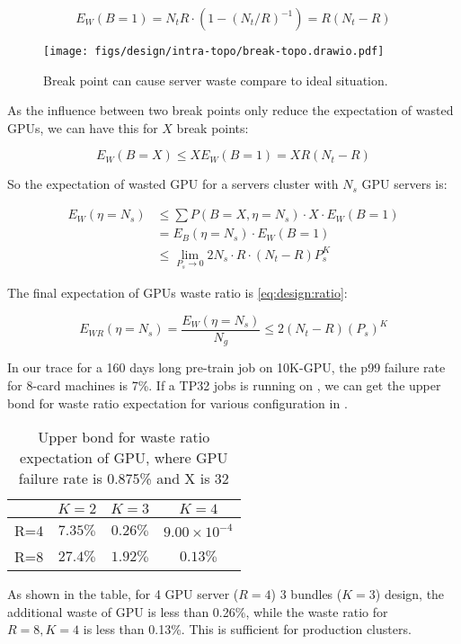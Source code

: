 \vspace{-1em}
$$
E_W(B=1) = N_t R\cdot (1 - (N_t/R)^{-1} ) = R(N_t -R)
$$

\begin{figure}[h!t]
    \centering
    \texttt{[image: figs/design/intra-topo/break-topo.drawio.pdf]}
    \caption{Break point can cause server waste compare to ideal situation.}
    \vspace{-1em}
    \label{fig:subline-waste}
\end{figure}

As the influence between two break points only reduce the expectation of wasted GPUs, we can have this for $X$ break points:

\vspace{-1em}
\begin{equation*}
E_W(B = X) \leq XE_W(B=1) = XR(N_t-R)
\end{equation*}

So the expectation of wasted GPU for a servers cluster with $N_s$ GPU servers is:

\vspace{-1em}
\begin{align*}
E_W(\eta = N_s) &\leq \sum P(B=X ,\eta = N_s) \cdot X\cdot  E_W(B=1)\\
&= E_B(\eta = N_s)\cdot E_W(B=1)\\
&\leq  \lim_{P_s\rightarrow 0}2N_s\cdot R \cdot (N_t-R)P_s^K
\end{align*}



The final expectation of GPUs waste ratio is \eqref{eq:design:ratio}:

\begin{equation}
E_{WR}(\eta = N_s) = \frac{E_W(\eta = N_s)}{N_g} \leq 2(N_t-R)(P_s)^K
\label{eq:design:ratio}
\end{equation}

In our trace for a 160 days long pre-train job on 10K-GPU, the p99 failure rate for 8-card machines is 7\%. If a TP32 jobs is running on \sys, we can get the upper bond for waste ratio expectation for various configuration in .

\begin{table}[h!t]
\centering
\begin{tabular}{cccc}
    \toprule
        & $K=2$&$K=3$&$K=4$\\
    \midrule
     R=4& $7.35\%$ & $0.26\%$ & $9.00\times 10^{-4}$ \\
     R=8& $27.4\%$ & $1.92\%$ & $0.13\%$ \\
     \bottomrule
\end{tabular}
\caption{Upper bond for waste ratio expectation of GPU, where GPU failure rate is 0.875\% and X is 32}
\vspace{-2em}
\label{table:design:1.5ratio}
\end{table}

As shown in the table, for 4 GPU server ($R=4$) 3 bundles ($K = 3$) design, the additional waste of GPU is less than 0.26\%, while the waste ratio for $R=8,K=4$ is less than 0.13\%. This is sufficient for production clusters. 